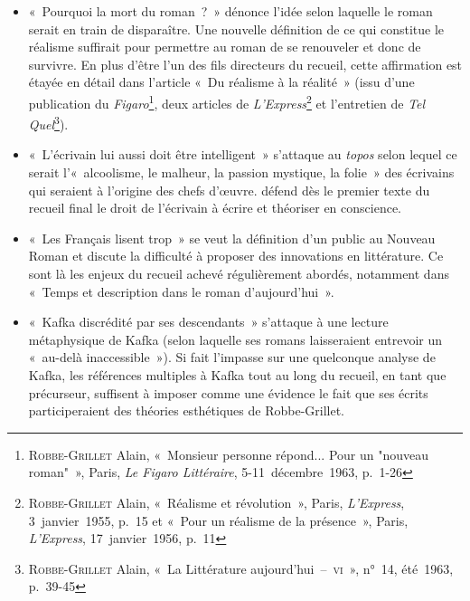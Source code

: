 \documentclass[12pt, a4paper]{article}
\begin{document}
\begin{itemize}
    \item «~Pourquoi la mort du roman~?~» dénonce l'idée selon laquelle le roman serait en train de disparaître. Une nouvelle définition de ce qui constitue le réalisme suffirait pour permettre au roman de se renouveler et donc de survivre. En plus d'être l'un des fils directeurs du recueil, cette affirmation est étayée en détail dans l'article «~Du réalisme à la réalité~» (issu d'une publication du \textit{Figaro}\footnote{\textsc{Robbe-Grillet} Alain, «~Monsieur personne répond... Pour un "nouveau roman"~», Paris, \textit{Le Figaro Littéraire}, 5-11~décembre~1963, p.~1-26}, deux articles de \textit{L'Express}\footnote{\textsc{Robbe-Grillet} Alain, «~Réalisme et révolution~», Paris, \textit{L'Express}, 3~janvier~1955, p.~15 et «~Pour un réalisme de la présence~», Paris, \textit{L'Express}, 17~janvier~1956, p.~11} et l'entretien de \textit{Tel Quel}\footnote{\textsc{Robbe-Grillet} Alain, «~La Littérature aujourd'hui~–~\textsc{vi}~», n°~14, été~1963, p.~39-45}).
    \item «~L’écrivain lui aussi doit être intelligent~» s'attaque au \textit{topos} selon lequel ce serait l'«~alcoolisme, le malheur, la passion mystique, la folie~» des écrivains qui seraient à l'origine des chefs d'œuvre. \robbe{} défend dès le premier texte du recueil final le droit de l'écrivain à écrire et théoriser en conscience.
    \item «~Les Français lisent trop~» se veut la définition d'un public au Nouveau Roman et discute la difficulté à proposer des innovations en littérature. Ce sont là les enjeux du recueil achevé régulièrement abordés, notamment dans «~Temps et description dans le roman d'aujourd'hui~».
    \item «~Kafka discrédité par ses descendants~» s'attaque à une lecture métaphysique de Kafka (selon laquelle ses romans laisseraient entrevoir un «~au-delà inaccessible~»). Si \punr{} fait l'impasse sur une quelconque analyse de Kafka, les références multiples à Kafka tout au long du recueil, en tant que précurseur, suffisent à imposer comme une évidence le fait que ses écrits participeraient des théories esthétiques de Robbe-Grillet.
\end{itemize}
\end{document}
